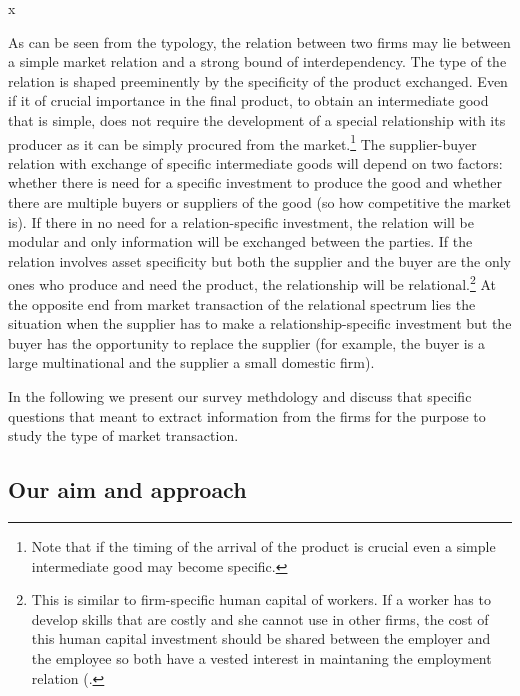 x\documentclass[final, dvipsnames, authoryear,12pt]{elsarticle}
\begin{document}
    As can be seen from the typology, the relation between two firms may lie between a simple market relation and a strong bound of interdependency. The type of the relation is shaped preeminently by the specificity of the product exchanged. Even if it of crucial importance in the final product, to obtain an intermediate good that is simple, does not require the development of a special relationship with its producer as it can be simply procured from the market.\footnote{Note that if the timing of the arrival of the product is crucial even a simple intermediate good may become specific.} The supplier-buyer relation with exchange of specific intermediate goods will depend on two factors: whether there is need for a specific investment to produce the good and whether there are multiple buyers or suppliers of the good (so how competitive the market is). If there in no need for a relation-specific investment, the relation will be modular and only information will be exchanged between the parties. If the relation involves asset specificity but both the supplier and the buyer are the only ones who produce and need the product, the relationship will be relational.\footnote{This is similar to firm-specific human capital of workers. If a worker has to develop skills that are costly and she cannot use in other firms, the cost of this human capital investment should be shared between the employer and the employee so both have a vested interest in maintaning the employment relation (\cite{becker1962investment}.} At the opposite end from market transaction of the relational spectrum lies the situation when the supplier has to make a relationship-specific investment but the buyer has the opportunity to replace the supplier (for example, the buyer is a large multinational and the supplier a small domestic firm).  
    
    In the following we present our survey methdology and discuss that specific questions that meant to extract information from the firms for the purpose to study the type of market transaction.
  
\subsection{Our aim and approach}
\end{document}
